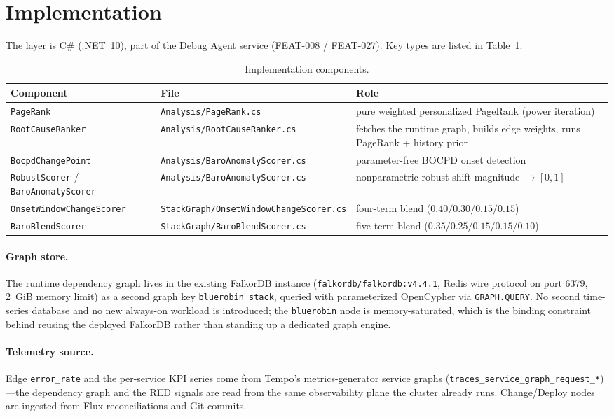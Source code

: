 \documentclass[11pt]{article}
\begin{document}
\section{Implementation}

The layer is C\# (.NET~10), part of the Debug Agent service (FEAT-008 /
FEAT-027). Key types are listed in Table~\ref{tab:components}.

\begin{table}[ht]
\centering
\caption{Implementation components.}
\label{tab:components}
\begin{tabular}{lll}
\toprule
Component & File & Role \\
\midrule
\texttt{PageRank} & \texttt{Analysis/PageRank.cs} & pure weighted personalized PageRank (power iteration) \\
\texttt{RootCauseRanker} & \texttt{Analysis/RootCauseRanker.cs} & fetches the runtime graph, builds edge weights, runs PageRank + history prior \\
\texttt{BocpdChangePoint} & \texttt{Analysis/BaroAnomalyScorer.cs} & parameter-free BOCPD onset detection \\
\texttt{RobustScorer} / \texttt{BaroAnomalyScorer} & \texttt{Analysis/BaroAnomalyScorer.cs} & nonparametric robust shift magnitude $\to [0,1]$ \\
\texttt{OnsetWindowChangeScorer} & \texttt{StackGraph/OnsetWindowChangeScorer.cs} & four-term blend ($0.40/0.30/0.15/0.15$) \\
\texttt{BaroBlendScorer} & \texttt{StackGraph/BaroBlendScorer.cs} & five-term blend ($0.35/0.25/0.15/0.15/0.10$) \\
\bottomrule
\end{tabular}
\end{table}

\paragraph{Graph store.}
The runtime dependency graph lives in the existing FalkorDB instance
(\texttt{falkordb/falkordb:v4.4.1}, Redis wire protocol on port 6379, 2~GiB memory
limit) as a second graph key \texttt{bluerobin\_stack}, queried with parameterized
OpenCypher via \texttt{GRAPH.QUERY}. No second time-series database and no new
always-on workload is introduced; the \texttt{bluerobin} node is memory-saturated,
which is the binding constraint behind reusing the deployed FalkorDB rather than
standing up a dedicated graph engine.

\paragraph{Telemetry source.}
Edge \texttt{error\_rate} and the per-service KPI series come from Tempo's
metrics-generator service graphs (\texttt{traces\_service\_graph\_request\_*})---the
dependency graph and the RED signals are read from the same observability plane the
cluster already runs. Change/Deploy nodes are ingested from Flux reconciliations
and Git commits.
\end{document}
